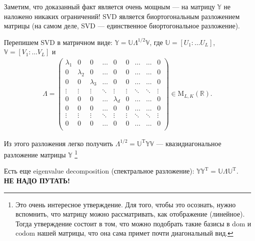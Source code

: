 Заметим, что доказанный факт является очень мощным --- на матрицу $\mathbb Y$ не наложено никаких ограничений!
SVD является биортогональным разложением матрицы (на самом деле, SVD --- единственное биортогональное разложение).

Перепишем SVD в матричном виде: $\mathbb Y = \mathbb U \Lambda^{1/2} \mathbb V$, где $\mathbb U = [U_1 \colon \ldots U_L]$, $\mathbb V = [V_1 \colon \ldots V_L]$ и
\begin{gather*}
    \Lambda = 
    \begin{pmatrix}
        \lambda_1 & 0 & 0 &\ldots & 0 & 0 & \ldots & \ldots & 0\\
        0 & \lambda_2 & 0 &\ldots & 0 & 0 & \ldots & \ldots & 0\\
        0 & 0 & \lambda_3 &\ldots & 0 & 0 & \ldots & \ldots & 0\\
        \vdots & \vdots & \vdots & \ddots & \vdots & \vdots & \ddots & \ddots & \vdots \\
        0 & 0 & 0 & \ldots & \lambda_d & 0 &  \ldots & \ldots & 0\\
        0 & 0 & 0 & \ldots & 0 & 0 &  \ldots & \ldots & 0\\
        \vdots & \vdots & \vdots & \ddots & \vdots & \vdots & \ddots & \ddots & \vdots \\
        0 & 0 & 0 & \ldots & 0 & 0 &  \ldots & \ldots & 0\\
    \end{pmatrix} \in \mathrm M_{L, K} (\mathbb R).
\end{gather*}

Из этого разложения легко получить $\Lambda^{1/2} = \mathbb U^\mathrm T \mathbb Y \mathbb V$ --- квазидиагональное разложение матрицы $\mathbb Y$ \footnote{Это очень интересное утверждение.
    Для того, чтобы это осознать, нужно вспомнить, что матрицу можно рассматривать, как отображение (линейное). Тогда утверждение состоит в том, что можно подобрать такие базисы в $\mathrm {dom}$ и $\mathrm {codom}$
нашей матрицы, что она сама примет почти диагональный вид.}

Есть еще eigenvalue decomposition (спектральное разложение): $\mathbb Y \mathbb Y^\mathrm T = \mathbb U \Lambda \mathbb U^\mathrm T$. \\
\textbf{\color{red} НЕ НАДО ПУТАТЬ!}
